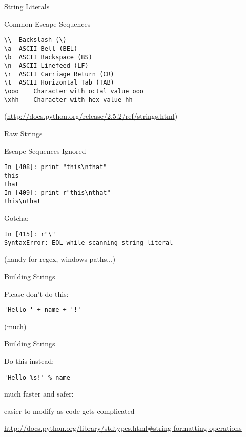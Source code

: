 \documentclass{beamer}
\begin{document}
\begin{frame}[fragile]{String Literals}

{\Large Common Escape Sequences}
\vfill
\begin{verbatim}
\\ 	Backslash (\) 	
\a 	ASCII Bell (BEL) 	
\b 	ASCII Backspace (BS) 	
\n 	ASCII Linefeed (LF) 	
\r 	ASCII Carriage Return (CR) 	
\t 	ASCII Horizontal Tab (TAB) 	
\ooo 	Character with octal value ooo 
\xhh 	Character with hex value hh
\end{verbatim}
(\url{http://docs.python.org/release/2.5.2/ref/strings.html})
\end{frame} 

\begin{frame}[fragile]{Raw Strings}

{\Large Escape Sequences Ignored}
\vfill
\begin{verbatim}
In [408]: print "this\nthat"
this
that
In [409]: print r"this\nthat"
this\nthat
\end{verbatim}

{\Large Gotcha:}
\begin{verbatim}
In [415]: r"\"
SyntaxError: EOL while scanning string literal
\end{verbatim}

\vfill
(handy for regex, windows paths...)
\end{frame} 


\begin{frame}[fragile]{Building Strings}

{\Large Please don't do this:

\vfill
\begin{verbatim}
'Hello ' + name + '!'
\end{verbatim}
}
\vfill
(much)

\end{frame} 

\begin{frame}[fragile]{Building Strings}

{\Large Do this instead:

\vfill
\begin{verbatim}
'Hello %s!' % name
\end{verbatim}

\vfill
much faster and safer:

\vfill
easier to modify as code gets complicated
}

\vfill
\url{http://docs.python.org/library/stdtypes.html#string-formatting-operations}
\end{frame} 
\end{document}

